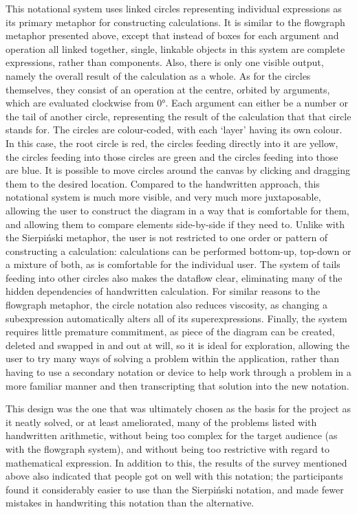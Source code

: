 \documentclass[12pt,twoside,notitlepage,xetex]{report}
\begin{document}
This notational system uses linked circles representing individual expressions
as its primary metaphor for constructing calculations.  It is similar to the
flowgraph metaphor presented above, except that instead of boxes for each
argument and operation all linked together, single, linkable objects in this
system are complete expressions, rather than components.  Also, there is only
one visible output, namely the overall result of the calculation as a whole.
As for the circles themselves, they consist of an operation at the centre,
orbited by arguments, which are evaluated clockwise from 0°.  Each argument can
either be a number or the tail of another circle, representing the result of
the calculation that that circle stands for.  The circles are colour-coded,
with each `layer' having its own colour.  In this case, the root circle is red,
the circles feeding directly into it are yellow, the circles feeding into those
circles are green and the circles feeding into those are blue.  It is possible
to move circles around the canvas by clicking and dragging them to the desired
location.  Compared to the handwritten approach, this notational system is much
more visible, and very much more juxtaposable, allowing the user to construct
the diagram in a way that is comfortable for them, and allowing them to compare
elements side-by-side if they need to.  Unlike with the Sierpiński metaphor,
the user is not restricted to one order or pattern of constructing a
calculation: calculations can be performed bottom-up, top-down or a mixture of
both, as is comfortable for the individual user.  The system of tails feeding
into other circles also makes the dataflow clear, eliminating many of the
hidden dependencies of handwritten calculation.  For similar reasons to the
flowgraph metaphor, the circle notation also reduces viscosity, as changing a
subexpression automatically alters all of its superexpressions.  Finally, the
system requires little premature commitment, as piece of the diagram can be
created, deleted and swapped in and out at will, so it is ideal for
exploration, allowing the user to try many ways of solving a problem within the
application, rather than having to use a secondary notation or device to help
work through a problem in a more familiar manner and then transcripting that
solution into the new notation.

This design was the one that was ultimately chosen as the basis for the project
as it neatly solved, or at least ameliorated, many of the problems listed with
handwritten arithmetic, without being too complex for the target audience (as
with the flowgraph system), and without being too restrictive with regard to
mathematical expression.  In addition to this, the results of the survey
mentioned above also indicated that people got on well with this notation; the
participants found it considerably easier to use than the Sierpiński notation,
and made fewer mistakes in handwriting this notation than the alternative.
\end{document}
